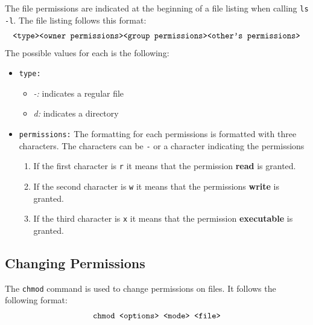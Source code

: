 \documentclass{report}
\begin{document}
    The file permissions are indicated at the beginning of a file listing when calling \texttt{ls -l}. The file listing follows this format:
    \begin{align}
      \textnormal{\texttt{<type><owner permissions><group permissions><other's permissions>}}
    \end{align}
    The possible values for each is the following:
    \begin{itemize}
      \item \texttt{type:}
      \begin{itemize}
         \item \textit{-:} indicates a regular file
         \item \textit{d:} indicates a directory
      \end{itemize}
      \item \texttt{permissions:} The formatting for each permissions is formatted with three characters. The characters can be \texttt{-} or a character indicating the permissions
      \begin{enumerate}
         \item If the first character is \texttt{r} it means that the permission \textbf{read} is granted.
         \item If the second character is \texttt{w} it means that the permissions \textbf{write} is granted.
         \item If the third character is \texttt{x} it means that the permission \textbf{executable} is granted.
      \end{enumerate}
    \end{itemize}



    \subsection{Changing Permissions}

    The \texttt{chmod} command is used to change permissions on files. It follows the following format:
    \begin{align}
      \textnormal{\texttt{chmod <options> <mode> <file>}}
    \end{align}
\end{document}
